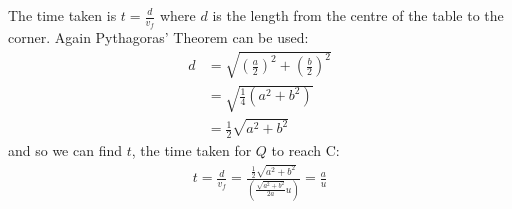 \begin{hint}
{\begin{enumerate}
The time taken is $t = \frac{d}{v_{f}}$ where $d$ is the length from the centre of the table to the corner. Again Pythagoras' Theorem can be used:
\begin{align*} d &= \sqrt{ \left(\frac{a}{2}\right)^{2} + \left(\frac{b}{2}\right)^{2} } \\ &= \sqrt{\frac{1}{4}(a^{2} + b^{2})} \\ &= \frac{1}{2}\sqrt{a^{2} + b^{2}} \end{align*}
and so we can find $t$, the time taken for $Q$ to reach C:
\begin{align*} t = \frac{d}{v_{f}} = \frac{\frac{1}{2}\sqrt{a^{2} + b^{2}}}{\left(\frac{\sqrt{a^{2} + b^{2}}}{2a} u\right)} = \frac{a}{u} \end{align*}

\end{enumerate}
}
\end{hint}